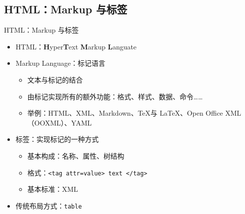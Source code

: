 \documentclass{beamer}
\begin{document}
\subsection{HTML：Markup 与标签}
\begin{frame}{HTML：Markup 与标签}
\begin{itemize}
    \item HTML：\textbf{H}yper\textbf{T}ext \textbf{M}arkup \textbf{L}anguate
    \item Markup Language：标记语言
    \begin{itemize}
        \item 文本与标记的结合
        \item 由标记实现所有的额外功能：格式、样式、数据、命令……
        \item 举例：HTML、XML、Markdown、\TeX 与 \LaTeX 、Open Office XML（OOXML）、YAML
    \end{itemize}
    \item 标签：实现标记的一种方式
    \begin{itemize}
        \item 基本构成：名称、属性、树结构
        \item 格式：\texttt{<tag attr=value> text </tag>}
        \item 基本标准：XML
    \end{itemize}
    \item 传统布局方式：\texttt{table}
\end{itemize}

\end{frame}
\end{document}
